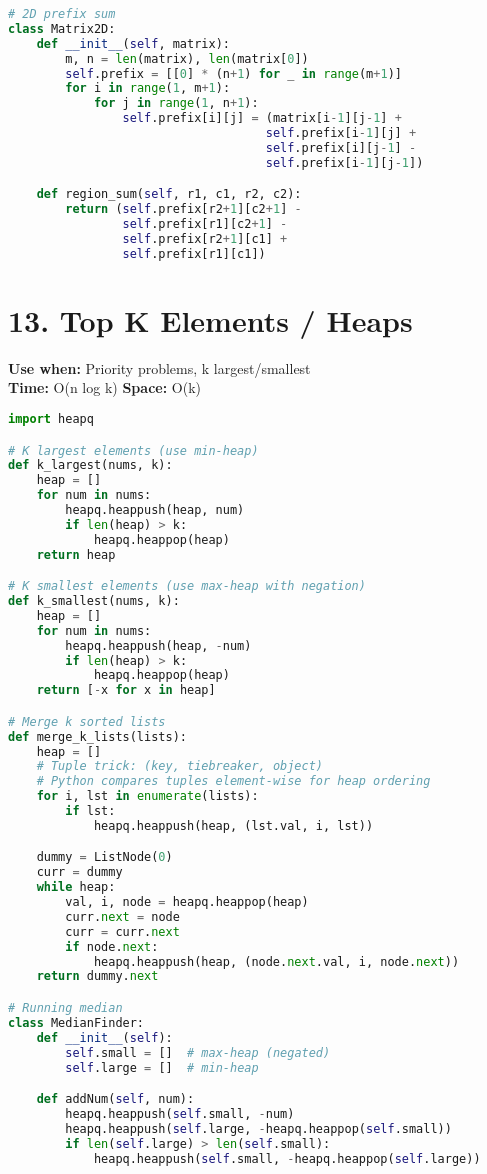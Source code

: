\documentclass[8pt,landscape]{article}
\begin{document}
\begin{multicols}{3}
\begin{lstlisting}[language=Python]
# 2D prefix sum
class Matrix2D:
    def __init__(self, matrix):
        m, n = len(matrix), len(matrix[0])
        self.prefix = [[0] * (n+1) for _ in range(m+1)]
        for i in range(1, m+1):
            for j in range(1, n+1):
                self.prefix[i][j] = (matrix[i-1][j-1] +
                                    self.prefix[i-1][j] +
                                    self.prefix[i][j-1] -
                                    self.prefix[i-1][j-1])

    def region_sum(self, r1, c1, r2, c2):
        return (self.prefix[r2+1][c2+1] -
                self.prefix[r1][c2+1] -
                self.prefix[r2+1][c1] +
                self.prefix[r1][c1])
\end{lstlisting}

\section*{13. Top K Elements / Heaps}
\textbf{Use when:} Priority problems, k largest/smallest \\
\textbf{Time:} O(n log k) \quad \textbf{Space:} O(k)
\begin{lstlisting}[language=Python]
import heapq

# K largest elements (use min-heap)
def k_largest(nums, k):
    heap = []
    for num in nums:
        heapq.heappush(heap, num)
        if len(heap) > k:
            heapq.heappop(heap)
    return heap

# K smallest elements (use max-heap with negation)
def k_smallest(nums, k):
    heap = []
    for num in nums:
        heapq.heappush(heap, -num)
        if len(heap) > k:
            heapq.heappop(heap)
    return [-x for x in heap]

# Merge k sorted lists
def merge_k_lists(lists):
    heap = []
    # Tuple trick: (key, tiebreaker, object)
    # Python compares tuples element-wise for heap ordering
    for i, lst in enumerate(lists):
        if lst:
            heapq.heappush(heap, (lst.val, i, lst))

    dummy = ListNode(0)
    curr = dummy
    while heap:
        val, i, node = heapq.heappop(heap)
        curr.next = node
        curr = curr.next
        if node.next:
            heapq.heappush(heap, (node.next.val, i, node.next))
    return dummy.next

# Running median
class MedianFinder:
    def __init__(self):
        self.small = []  # max-heap (negated)
        self.large = []  # min-heap

    def addNum(self, num):
        heapq.heappush(self.small, -num)
        heapq.heappush(self.large, -heapq.heappop(self.small))
        if len(self.large) > len(self.small):
            heapq.heappush(self.small, -heapq.heappop(self.large))


\end{lstlisting}
\end{multicols}
\end{document}
